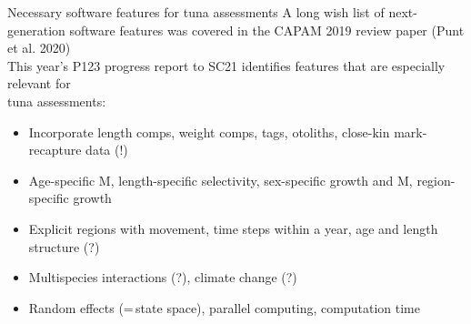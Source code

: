 \documentclass[aspectratio=169,fleqn]{beamer}
\begin{document}
\begin{frame}{Necessary software features for tuna assessments}\small
  A long wish list of next-generation software features was covered in the CAPAM
  2019 review paper (Punt et al. 2020)\\[2.5ex]
  This year's P123 progress report to SC21 identifies features that are
  especially relevant for\\
  tuna assessments:\\[1.5ex]
  \begin{itemize}
    \item Incorporate length comps, weight comps, tags, otoliths, close-kin
    mark-recapture data (!)\\[2ex]
    \item Age-specific M, length-specific selectivity, sex-specific growth and
    M, region-specific growth\\[2ex]
    \item Explicit regions with movement, time steps within a year, age and
    length structure (?)\\[2ex]
    \item Multispecies interactions (?), climate change (?)\\[2ex]
    \item Random effects (=\,state space), parallel computing, computation
    time\\[2ex]
  \end{itemize}
\end{frame}

\end{document}
